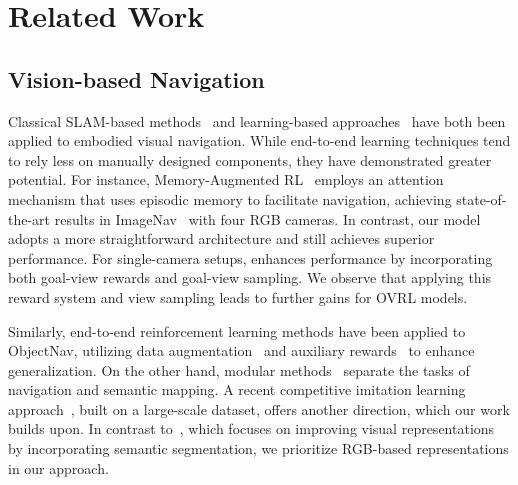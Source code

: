 \section{Related Work}

\subsection{Vision-based Navigation}


Classical SLAM-based methods~\cite{chaplot2020neural} and learning-based approaches~\cite{maksymets2021thda,mezghan2022memory,wang2024toward,qin2023supfusion} have both been applied to embodied visual navigation. While end-to-end learning techniques tend to rely less on manually designed components, they have demonstrated greater potential. For instance, Memory-Augmented RL~\cite{mezghan2022memory} employs an attention mechanism that uses episodic memory to facilitate navigation, achieving state-of-the-art results in ImageNav~\cite{zhu2017target} with four RGB cameras. In contrast, our model adopts a more straightforward architecture and still achieves superior performance. For single-camera setups, \cite{al2022zero} enhances performance by incorporating both goal-view rewards and goal-view sampling. We observe that applying this reward system and view sampling leads to further gains for OVRL models.

Similarly, end-to-end reinforcement learning methods have been applied to ObjectNav, utilizing data augmentation~\cite{maksymets2021thda} and auxiliary rewards~\cite{ye2021auxiliary} to enhance generalization. On the other hand, modular methods~\cite{chaplot2020object,ramakrishnan2022poni} separate the tasks of navigation and semantic mapping. A recent competitive imitation learning approach~\cite{ramrakhya2022habitat}, built on a large-scale dataset, offers another direction, which our work builds upon. In contrast to~\cite{mousavian2019visual}, which focuses on improving visual representations by incorporating semantic segmentation, we prioritize RGB-based representations in our approach.

